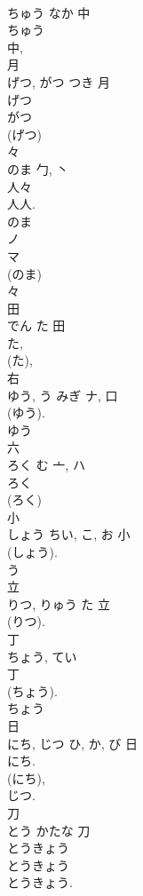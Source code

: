 \documentclass[8pt]{extreport}
\begin{document}
\begin{CJK}{UTF8}{min}
\\	ちゅう	なか	中	
\\	ちゅう 
\\	中, 
\\	月	
\\	げつ, がつ	つき	月	
\\	げつ 
\\	がつ 
\\	(げつ) 
\\	々	
\\	のま	勹, 丶	
\\	人々 
\\	人人. 
\\	のま 
\\	ノ 
\\	マ 
\\	(のま) 
\\	々
\\	田	
\\	でん	た	田	
\\	た, 
\\	(た), 
\\	右	
\\	ゆう, う	みぎ	ナ, 口	
\\	(ゆう). 
\\	ゆう 
\\	六	
\\	ろく	む	亠, ハ	
\\	ろく 
\\	(ろく) 
\\	小	
\\	しょう	ちい, こ, お	小	
\\	(しょう). 
\\	う 
\\	立	
\\	りつ, りゅう	た	立	
\\	(りつ).	
\\	丁	
\\	ちょう, てい	
\\	丁	
\\	(ちょう).	
\\	ちょう 
\\	日	
\\	にち, じつ	ひ, か, び	日	
\\	にち. 
\\	(にち), 
\\	じつ. 
\\	刀	
\\	とう	かたな	刀	
\\	とうきょう 
\\	とうきょう 
\\	とうきょう.	

\end{CJK}
\end{document}
